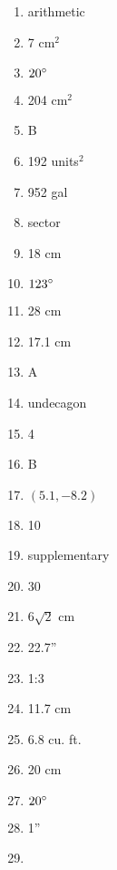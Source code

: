 \documentclass[../uilmath.tex]{subfiles}
\begin{document}
\begin{enumerate}[label=\bfseries\arabic*.]
    \item %
    arithmetic

    \item %
    7 cm$^2$

    \item %
    $20\degree$

    \item %
    204 cm$^2$

    \item %
    B 

    \item %
    192 units$^2$

    \item %
    952 gal 

    \item %
    sector 

    \item %
    18 cm

    \item %
    $123\degree$

    \item %
    28 cm 

    \item %
    17.1 cm 

    \item %
    A 

    \item %
    undecagon 

    \item %
    4

    \item %
    B 

    \item %
    $(5.1,-8.2)$

    \item %
    10

    \item %
    supplementary

    \item %
    30

    \item %
    $6\sqrt{2}$ cm 

    \item %
    22.7''

    \item %
    1:3

    \item %
    11.7 cm 

    \item %
    6.8 cu. ft. 

    \item %
    20 cm

    \item %
    $20\degree$

    \item %
    1''

    \item %
    
\end{enumerate}
\end{document}
